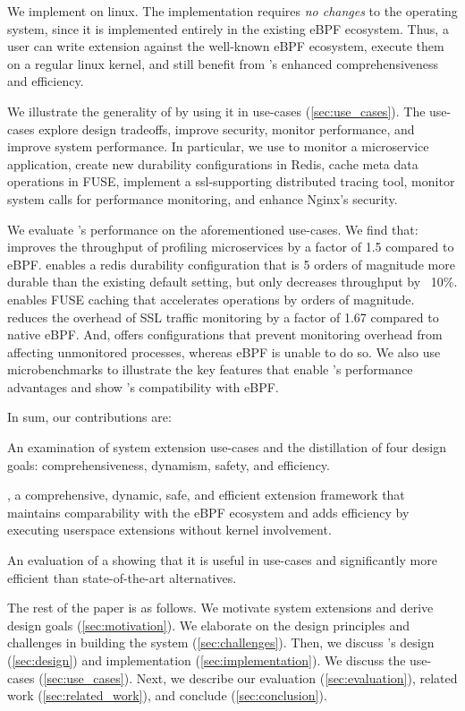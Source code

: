 We implement \sys{} on linux.  The implementation requires \emph{no changes} to the operating system, since it is implemented entirely in the existing eBPF ecosystem.  Thus, a user can write extension against the well-known eBPF ecosystem, execute them on a regular linux kernel, and still benefit from \sys{}'s enhanced comprehensiveness and efficiency.

We illustrate the generality of \sys by using it in \numcases use-cases (\cref{sec:use_cases}).  The use-cases explore design tradeoffs, improve security, monitor performance, and improve system performance.  In particular, we use \sys to monitor a microservice application, create new durability configurations in Redis, cache meta data operations in FUSE, implement a ssl-supporting distributed tracing tool, monitor system calls for performance monitoring, and enhance Nginx's security.

We evaluate \sys's performance on the aforementioned \numcases use-cases.  We find that: \sys improves the throughput of profiling microservices by a factor of 1.5 compared to eBPF.  \sys{} enables a redis durability configuration that is 5 orders of magnitude more durable than the existing default setting, but only decreases throughput by ~10\%.  \sys enables FUSE caching that accelerates operations by orders of magnitude.  \sys{} reduces the overhead of SSL traffic monitoring by a factor of 1.67 compared to native eBPF.  And, \sys offers configurations that prevent monitoring overhead from affecting unmonitored processes, whereas eBPF is unable to do so.  We also use microbenchmarks to illustrate the key features that enable \sys's performance advantages and show \sys's compatibility with eBPF.

In sum, our contributions are:
\begin{smitemize}
\item An examination of system extension use-cases and the distillation of four design goals: comprehensiveness, dynamism, safety, and efficiency. 
\item \sys, a comprehensive, dynamic, safe, and efficient extension framework that maintains comparability with the eBPF ecosystem and adds efficiency by executing userspace extensions without kernel involvement.
\item An evaluation of a \sys showing that it is useful in \numcases use-cases and significantly more efficient than state-of-the-art alternatives.
\end{smitemize}

The rest of the paper is as follows.   We motivate system extensions and derive design goals (\cref{sec:motivation}).  We elaborate on the design principles and challenges in building the system (\cref{sec:challenges}).  Then, we discuss \sys's design (\cref{sec:design}) and implementation (\cref{sec:implementation}).  We discuss the \numcases use-cases (\cref{sec:use_cases}).   Next, we describe our evaluation (\cref{sec:evaluation}), related work (\cref{sec:related_work}), and conclude (\cref{sec:conclusion}).
